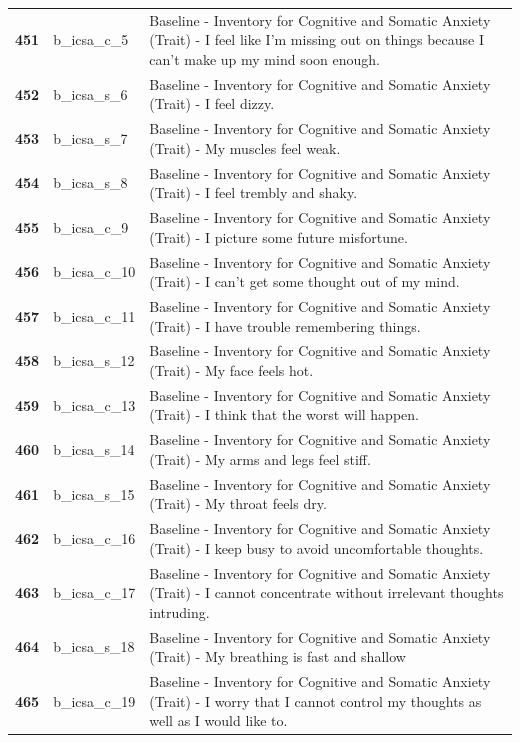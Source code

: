 \documentclass[
  letterpaper,
  DIV=11,
  numbers=noendperiod]{scrartcl}
\begin{document}
\begin{longtable}[t]{>{}cll}
\addlinespace
\textbf{451} & b\_icsa\_c\_5 & Baseline - Inventory for Cognitive and Somatic Anxiety (Trait) - I feel like I’m missing out on things because I can’t make up my mind soon enough.\\
\textbf{452} & b\_icsa\_s\_6 & Baseline - Inventory for Cognitive and Somatic Anxiety (Trait) - I feel dizzy.\\
\textbf{453} & b\_icsa\_s\_7 & Baseline - Inventory for Cognitive and Somatic Anxiety (Trait) - My muscles feel weak.\\
\textbf{454} & b\_icsa\_s\_8 & Baseline - Inventory for Cognitive and Somatic Anxiety (Trait) - I feel trembly and shaky.\\
\textbf{455} & b\_icsa\_c\_9 & Baseline - Inventory for Cognitive and Somatic Anxiety (Trait) - I picture some future misfortune.\\
\addlinespace
\textbf{456} & b\_icsa\_c\_10 & Baseline - Inventory for Cognitive and Somatic Anxiety (Trait) - I can’t get some thought out of my mind.\\
\textbf{457} & b\_icsa\_c\_11 & Baseline - Inventory for Cognitive and Somatic Anxiety (Trait) - I have trouble remembering things.\\
\textbf{458} & b\_icsa\_s\_12 & Baseline - Inventory for Cognitive and Somatic Anxiety (Trait) - My face feels hot.\\
\textbf{459} & b\_icsa\_c\_13 & Baseline - Inventory for Cognitive and Somatic Anxiety (Trait) - I think that the worst will happen.\\
\textbf{460} & b\_icsa\_s\_14 & Baseline - Inventory for Cognitive and Somatic Anxiety (Trait) - My arms and legs feel stiff.\\
\addlinespace
\textbf{461} & b\_icsa\_s\_15 & Baseline - Inventory for Cognitive and Somatic Anxiety (Trait) - My throat feels dry.\\
\textbf{462} & b\_icsa\_c\_16 & Baseline - Inventory for Cognitive and Somatic Anxiety (Trait) - I keep busy to avoid uncomfortable thoughts.\\
\textbf{463} & b\_icsa\_c\_17 & Baseline - Inventory for Cognitive and Somatic Anxiety (Trait) - I cannot concentrate without irrelevant thoughts intruding.\\
\textbf{464} & b\_icsa\_s\_18 & Baseline - Inventory for Cognitive and Somatic Anxiety (Trait) - My breathing is fast and shallow\\
\textbf{465} & b\_icsa\_c\_19 & Baseline - Inventory for Cognitive and Somatic Anxiety (Trait) - I worry that I cannot control my thoughts as well as I would like to.\\

\end{longtable}
\end{document}
